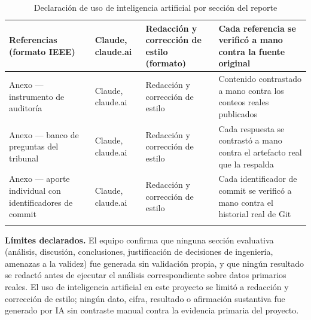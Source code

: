 \begin{longtable}{|L{2.6cm}|L{3.0cm}|L{3.6cm}|L{5.8cm}|}
Referencias (formato IEEE) & Claude, claude.ai & Redacción y corrección de estilo (formato) & Cada referencia se verificó a mano contra la fuente original \\ \hline
Anexo --- instrumento de auditoría & Claude, claude.ai & Redacción y corrección de estilo & Contenido contrastado a mano contra los conteos reales publicados \\ \hline
Anexo --- banco de preguntas del tribunal & Claude, claude.ai & Redacción y corrección de estilo & Cada respuesta se contrastó a mano contra el artefacto real que la respalda \\ \hline
Anexo --- aporte individual con identificadores de commit & Claude, claude.ai & Redacción y corrección de estilo & Cada identificador de commit se verificó a mano contra el historial real de Git \\ \hline
\caption{Declaración de uso de inteligencia artificial por sección del reporte}
\end{longtable}

\noindent\textbf{Límites declarados.} El equipo confirma que ninguna sección
evaluativa (análisis, discusión, conclusiones, justificación de decisiones de
ingeniería, amenazas a la validez) fue generada sin validación propia, y que
ningún resultado se redactó antes de ejecutar el análisis correspondiente
sobre datos primarios reales. El uso de inteligencia artificial en este
proyecto se limitó a redacción y corrección de estilo; ningún dato, cifra,
resultado o afirmación sustantiva fue generado por IA sin contraste manual
contra la evidencia primaria del proyecto.
